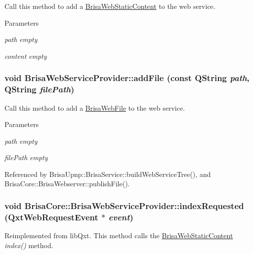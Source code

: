 Call this method to add a \hyperlink{classBrisaCore_1_1BrisaWebStaticContent}{BrisaWebStaticContent} to the web service. 
\begin{DoxyParams}{Parameters}
\item[{\em path}]{\itshape empty\/} \item[{\em content}]{\itshape empty\/} \end{DoxyParams}
\hypertarget{classBrisaCore_1_1BrisaWebServiceProvider_a2732014aacccc107547a651499482011}{
\subsubsection[{addFile}]{\setlength{\rightskip}{0pt plus 5cm}void BrisaWebServiceProvider::addFile (const QString {\em path}, \/  QString {\em filePath})}}
\label{classBrisaCore_1_1BrisaWebServiceProvider_a2732014aacccc107547a651499482011}


Call this method to add a \hyperlink{classBrisaCore_1_1BrisaWebFile}{BrisaWebFile} to the web service. 
\begin{DoxyParams}{Parameters}
\item[{\em path}]{\itshape empty\/} \item[{\em filePath}]{\itshape empty\/} \end{DoxyParams}


Referenced by BrisaUpnp::BrisaService::buildWebServiceTree(), and BrisaCore::BrisaWebserver::publishFile().\hypertarget{classBrisaCore_1_1BrisaWebServiceProvider_a7f2a7a7f9f22a29cb859478ca518129c}{
\subsubsection[{indexRequested}]{\setlength{\rightskip}{0pt plus 5cm}void BrisaCore::BrisaWebServiceProvider::indexRequested (QxtWebRequestEvent $\ast$ {\em event})}}
\label{classBrisaCore_1_1BrisaWebServiceProvider_a7f2a7a7f9f22a29cb859478ca518129c}


Reimplemented from libQxt. This method calls the \hyperlink{classBrisaCore_1_1BrisaWebStaticContent}{BrisaWebStaticContent} {\itshape index()\/} method.


